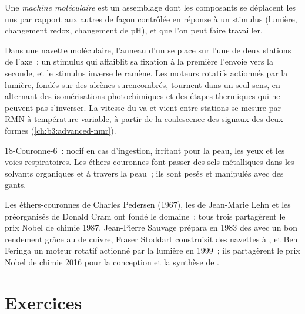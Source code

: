 \begin{definition}\label{def:b3:supramolecular:machine}
Une \emph{machine moléculaire} est un assemblage dont
les composants se déplacent les uns par rapport aux autres de façon
contrôlée en réponse à un stimulus (lumière, changement redox, changement
de pH), et que l'on peut faire travailler.
\end{definition}

Dans une navette moléculaire, l'anneau d'un  se place sur l'une de
deux stations de l'axe~; un stimulus qui affaiblit sa fixation à la première
l'envoie vers la seconde, et le stimulus inverse le ramène. Les moteurs
rotatifs actionnés par la lumière, fondés sur des alcènes surencombrés,
tournent dans un seul sens, en alternant des isomérisations
photochimiques et des étapes thermiques qui ne peuvent pas s'inverser. La
vitesse du va-et-vient entre stations se mesure par RMN à température
variable, à partir de la coalescence des signaux des deux formes
(\cref{ch:b3:advanced-nmr}).

\begin{safety}{}
18-Couronne-6~: nocif en cas d'ingestion, irritant pour la peau, les yeux
et les voies respiratoires. Les éthers-couronnes font passer des sels
métalliques dans les solvants organiques et à travers la peau~; ils sont
pesés et manipulés avec des gants.
\end{safety}

\begin{history}
Les éthers-couronnes de Charles Pedersen (1967), les  de
Jean-Marie Lehn et les  préorganisés de Donald Cram ont fondé le
domaine~; tous trois partagèrent le prix Nobel de chimie 1987. Jean-Pierre
Sauvage prépara en 1983 des  avec un bon rendement grâce au  de
cuivre, Fraser Stoddart construisit des navettes à , et Ben Feringa
un moteur rotatif actionné par la lumière en 1999~; ils partagèrent le prix
Nobel de chimie 2016 pour la conception et la synthèse de .
\end{history}

\section{Exercices}


